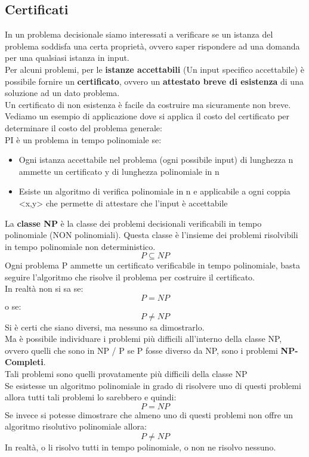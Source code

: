 \documentclass[a4paper,12pt]{article}
\begin{document}
\subsection{Certificati}
In un problema decisionale siamo interessati a verificare se un istanza del problema soddisfa una certa proprietà, ovvero saper rispondere ad una domanda per una qualsiasi istanza in input.\\
Per alcuni problemi, per le \textbf{istanze accettabili} (Un input specifico accettabile) è possibile fornire un \textbf{certificato}, ovvero un \textbf{attestato breve di esistenza} di una soluzione ad un dato problema.\\
Un certificato di non esistenza è facile da costruire ma sicuramente non breve.\\
Vediamo un esempio di applicazione dove si applica il costo del certificato per determinare il costo del problema generale:\\
PI è un problema in tempo polinomiale se:
\begin{itemize}
    \item Ogni istanza accettabile nel problema (ogni possibile input) di lunghezza n ammette un certificato y di lunghezza polinomiale in n
    \item Esiste un algoritmo di verifica polinomiale in n e applicabile a ogni coppia <x,y> che permette di attestare che l'input è accettabile
\end{itemize}
La \textbf{classe NP} è la classe dei problemi decisionali verificabili in tempo polinomiale (NON polinomiali). Questa classe è l'insieme dei problemi risolvibili in tempo polinomiale non deterministico.\\
\[
P \subseteq NP
\]
Ogni problema P ammette un certificato verificabile in tempo polinomiale, basta seguire l'algoritmo che risolve il problema per costruire il certificato.\\
In realtà non si sa se:
\[
P = NP
\]
o se:
\[
P \ne NP
\]
Si è certi che siano diversi, ma nessuno sa dimostrarlo.\\
Ma è possibile individuare i problemi più difficili all'interno della classe NP, ovvero quelli che sono in NP / P se P fosse diverso da NP, sono i problemi \textbf{NP-Completi}.\\
Tali problemi sono quelli provatamente più difficili della classe NP\\
Se esistesse un algoritmo polinomiale in grado di risolvere uno di questi problemi allora tutti tali problemi lo sarebbero e quindi:
\[
P = NP
\]
Se invece si potesse dimostrare che almeno uno di questi problemi non offre un algoritmo risolutivo polinomiale allora:
\[
P \ne NP
\]
In realtà, o li risolvo tutti in tempo polinomiale, o non ne risolvo nessuno.
\end{document}
